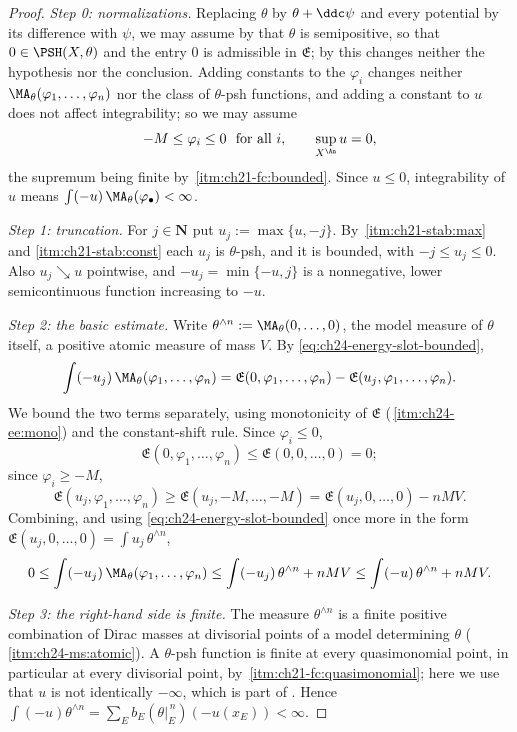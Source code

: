 \begin{proof}
\emph{Step 0: normalizations.}  Replacing $\theta$ by
$\theta+\ddc\psi$ and every potential by its difference with $\psi$, we
may assume by  that $\theta$ is
semipositive, so that $0\in\PSH(X,\theta)$ and the entry $0$ is
admissible in $\mathfrak E$; by
 this changes neither the hypothesis
nor the conclusion.  Adding constants to the $\varphi_i$ changes neither
$\MA_\theta(\varphi_1,\ldots,\varphi_n)$ nor the class of $\theta$-psh
functions, and adding a constant to $u$ does not affect integrability; so
we may assume
\[
 -M\leq\varphi_i\leq0\ \text{ for all }i,
 \qquad \sup_{X^{\An}}u=0 ,
\]
the supremum being finite by
\,\cref{itm:ch21-fc:bounded}.  Since
$u\leq0$, integrability of $u$ means
$\int(-u)\,\MA_\theta(\varphi_\bullet)<\infty$.

\emph{Step 1: truncation.}  For $j\in\mathbf N$ put
$u_j:=\max\{u,-j\}$.  By
\,\cref{itm:ch21-stab:max} and
\cref{itm:ch21-stab:const} each $u_j$ is $\theta$-psh, and it is bounded,
with $-j\leq u_j\leq0$.  Also $u_j\searrow u$ pointwise, and
$-u_j=\min\{-u,j\}$ is a nonnegative, lower semicontinuous function
increasing to $-u$.

\emph{Step 2: the basic estimate.}  Write
$\theta^{\wedge n}:=\MA_\theta(0,\ldots,0)$, the model measure of
$\theta$ itself, a positive atomic measure of mass $V$.  By
\eqref{eq:ch24-energy-slot-bounded},
\[
 \int(-u_j)\,\MA_\theta(\varphi_1,\ldots,\varphi_n)
 =\mathfrak E(0,\varphi_1,\ldots,\varphi_n)
  -\mathfrak E(u_j,\varphi_1,\ldots,\varphi_n).
\]
We bound the two terms separately, using monotonicity of $\mathfrak E$
(\,\cref{itm:ch24-ee:mono}) and the
constant-shift rule.  Since $\varphi_i\leq0$,
\[
 \mathfrak E(0,\varphi_1,\ldots,\varphi_n)\leq\mathfrak E(0,0,\ldots,0)=0 ;
\]
since $\varphi_i\geq-M$,
\[
 \mathfrak E(u_j,\varphi_1,\ldots,\varphi_n)
 \geq\mathfrak E(u_j,-M,\ldots,-M)
 =\mathfrak E(u_j,0,\ldots,0)-nMV .
\]
Combining, and using \eqref{eq:ch24-energy-slot-bounded} once more in the
form $\mathfrak E(u_j,0,\ldots,0)=\int u_j\,\theta^{\wedge n}$,
\begin{equation}
\label{eq:ch24-integrability-estimate}
 0\leq\int(-u_j)\,\MA_\theta(\varphi_1,\ldots,\varphi_n)
 \leq\int(-u_j)\,\theta^{\wedge n}+nMV
 \leq\int(-u)\,\theta^{\wedge n}+nMV .
\end{equation}

\emph{Step 3: the right-hand side is finite.}  The measure
$\theta^{\wedge n}$ is a finite positive combination of Dirac masses at
divisorial points of a model determining $\theta$
(\,\cref{itm:ch24-ms:atomic}).  A
$\theta$-psh function is finite at every quasimonomial point, in
particular at every divisorial point, by
\,\cref{itm:ch21-fc:quasimonomial}; here
we use that $u$ is not identically $-\infty$, which is part of
.  Hence
$\int(-u)\theta^{\wedge n}=\sum_Eb_E(\theta|_E^{\,n})(-u(x_E))<\infty$.


\end{proof}
